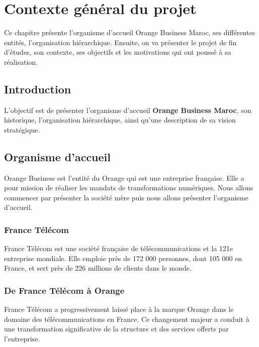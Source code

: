 \chapter{Contexte général du projet}

Ce chapitre présente l’organisme d’accueil Orange Business Maroc, ses différentes entités, l’organisation hiérarchique. 
Ensuite, on va présenter le projet de fin d’études, son contexte, ses objectifs et les motivations qui ont poussé à sa réalisation.

\clearpage

\section{Introduction}

L'objectif est de présenter l'organisme d'accueil \textbf{Orange Business Maroc}, son historique, l'organisation hiérarchique, ainsi qu'une description de sa vision stratégique.

\section{Organisme d’accueil}


Orange Business est l’entité du Orange qui est une entreprise française. 
Elle a pour mission de réaliser les mandats de transformations numériques. 
Nous allons commencer par présenter la société mère puis nous allons présenter l’organisme d’accueil.

\subsection{France Télécom}

France Télécom est une société française de télécommunications et la 121e entreprise mondiale. 
Elle emploie près de 172 000 personnes, dont 105 000 en France, et sert près de 226 millions de clients dans le monde. 

\subsection{De France Télécom à Orange}

France Télécom a progressivement laissé place à la marque Orange dans le domaine des télécommunications en France. 
Ce changement majeur a conduit à une transformation significative de la structure et des services offerts par l'entreprise.

